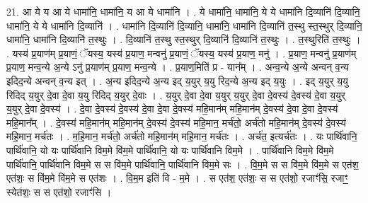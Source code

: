 \documentclass[17pt]{extarticle}
\begin{document}
21. आ ये य आ ये धामा॑नि॒ धामा॑नि॒ य आ ये धामा॑नि । . ये धामा॑नि॒ धामा॑नि॒ ये ये धामा॑नि दि॒व्यानि॑ दि॒व्यानि॒ धामा॑नि॒ ये ये धामा॑नि दि॒व्यानि॑ । . धामा॑नि दि॒व्यानि॑ दि॒व्यानि॒ धामा॑नि॒ धामा॑नि दि॒व्यानि॑ त॒स्थु स्त॒स्थुर् दि॒व्यानि॒ धामा॑नि॒ धामा॑नि दि॒व्यानि॑ त॒स्थुः । . दि॒व्यानि॑ त॒स्थु स्त॒स्थुर् दि॒व्यानि॑ दि॒व्यानि॑ त॒स्थुः । . त॒स्थुरिति॑ त॒स्थुः । . यस्य॑ प्र॒याण॑म् प्र॒याणं॒ ॅयस्य॒ यस्य॑ प्र॒याण॒ मन्वनु॑ प्र॒याणं॒ ॅयस्य॒ यस्य॑ प्र॒याण॒ मनु॑ । . प्र॒याण॒ मन्वनु॑ प्र॒याण॑म् प्र॒याण॒ मन्व॒न्ये अ॒न्ये ऽनु॑ प्र॒याण॑म् प्र॒याण॒ मन्व॒न्ये । . प्र॒याण॒मिति॑ प्र - यान᳚म् । . अन्व॒न्ये अ॒न्ये अन्वन् व॒न्य इदिद॒न्ये अन्वन् व॒न्य इत् । . अ॒न्य इदिद॒न्ये अ॒न्य इद् य॒युर् य॒यु रिद॒न्ये अ॒न्य इद् य॒युः । . इद् य॒युर् य॒यु रिदिद् य॒युर् दे॒वा दे॒वा य॒यु रिदिद् य॒युर् दे॒वाः । . य॒युर् दे॒वा दे॒वा य॒युर् य॒युर् दे॒वा दे॒वस्य॑ दे॒वस्य॑ दे॒वा य॒युर् य॒युर् दे॒वा दे॒वस्य॑ । . दे॒वा दे॒वस्य॑ दे॒वस्य॑ दे॒वा दे॒वा दे॒वस्य॑ महि॒मान॑म् महि॒मान॑म् दे॒वस्य॑ दे॒वा दे॒वा दे॒वस्य॑ महि॒मान᳚म् । . दे॒वस्य॑ महि॒मान॑म् महि॒मान॑म् दे॒वस्य॑ दे॒वस्य॑ महि॒मान॒ मर्च॑तो॒ अर्च॑तो महि॒मान॑म् दे॒वस्य॑ दे॒वस्य॑ महि॒मान॒ मर्च॑तः । . म॒हि॒मान॒ मर्च॑तो॒ अर्च॑तो महि॒मान॑म् महि॒मान॒ मर्च॑तः । . अर्च॑त॒ इत्यर्च॑तः । . यः पार्थि॑वानि॒ पार्थि॑वानि॒ यो यः पार्थि॑वानि विम॒मे वि॑म॒मे पार्थि॑वानि॒ यो यः पार्थि॑वानि विम॒मे । . पार्थि॑वानि विम॒मे वि॑म॒मे पार्थि॑वानि॒ पार्थि॑वानि विम॒मे स स वि॑म॒मे पार्थि॑वानि॒ पार्थि॑वानि विम॒मे सः । . वि॒म॒मे स स वि॑म॒मे वि॑म॒मे स एत॑श॒ एत॑शः॒ स वि॑म॒मे वि॑म॒मे स एत॑शः । . वि॒म॒म इति॑ वि - म॒मे । . स एत॑श॒ एत॑शः॒ स स एत॑शो॒ रजाꣳ॑सि॒ रजाꣳ॒॒ स्येत॑शः॒ स स एत॑शो॒ रजाꣳ॑सि । \newline
\end{document}
